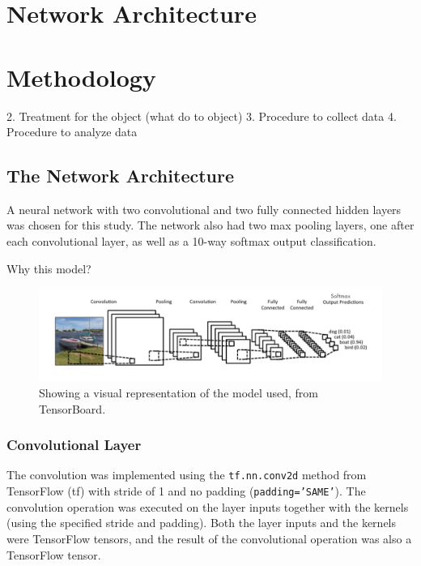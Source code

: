 \documentclass[]{article}
\begin{document}
\section{Network Architecture}



\section{Methodology}

2. Treatment for the object (what do to object)
3. Procedure to collect data
4. Procedure to analyze data


\subsection{The Network Architecture}

A neural network with two convolutional and two fully connected hidden layers was chosen for this study. The network also had two max pooling layers, one after each convolutional layer, as well as a 10-way softmax output classification. 

Why this model?

\begin{figure}[h]
	\includegraphics[width=\textwidth]{conv}
	\caption{Showing a visual representation of the model used, from TensorBoard.}
	\label{conv}
	\centering
\end{figure}

\subsubsection{Convolutional Layer}

The convolution was implemented using the \texttt{tf.nn.conv2d} method from TensorFlow (tf) with stride of 1 and no padding (\texttt{padding='SAME'}). The convolution operation was executed on the layer inputs together with the kernels (using the specified stride and padding). Both the layer inputs and the kernels were TensorFlow tensors, and the result of the convolutional operation was also a TensorFlow tensor. 
\end{document}
